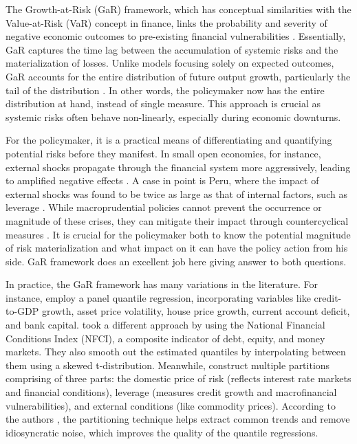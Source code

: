 \documentclass[12pt,a4paper]{article}
\begin{document}
The Growth-at-Risk (GaR) framework, which has conceptual similarities with the Value-at-Risk (VaR) concept in finance, links the probability and severity of negative economic outcomes to pre-existing financial vulnerabilities \citep{imf_gar_2019}. Essentially, GaR captures the time lag between the accumulation of systemic risks and the materialization of losses. Unlike models focusing solely on expected outcomes, GaR accounts for the entire distribution of future output growth, particularly the tail of the distribution \citep{szabo2020}. In other words, the policymaker now has the entire distribution at hand, instead of single measure. This approach is crucial as systemic risks often behave non-linearly, especially during economic downturns.

For the policymaker, it is a practical means of differentiating and quantifying potential risks before they manifest. In small open economies, for instance, external shocks propagate through the financial system more aggressively, leading to amplified negative effects \citep{esrb2021}. A case in point is Peru, where the impact of external shocks was found to be twice as large as that of internal factors, such as leverage \citep{imf_gar_2019}. While macroprudential policies cannot prevent the occurrence or magnitude of these crises, they can mitigate their impact through countercyclical measures \citep{esrb2021}. It is crucial for the policymaker both to know the potential magnitude of risk materialization and what impact on it can have the policy action from his side. GaR framework does an excellent job here giving answer to both questions.

In practice, the GaR framework has many variations in the literature. For instance, \citet{aikman2019} employ a panel quantile regression, incorporating variables like credit-to-GDP growth, asset price volatility, house price growth, current account deficit, and bank capital. \citet{adrian_2019} took a different approach by using the National Financial Conditions Index (NFCI), a composite indicator of debt, equity, and money markets. They also smooth out the estimated quantiles by interpolating between them using a skewed t-distribution. Meanwhile, \citet{imf_gar_2019} construct multiple partitions comprising of three parts: the domestic price of risk (reflects interest rate markets and financial conditions), leverage (measures credit growth and macrofinancial vulnerabilities), and external conditions (like commodity prices). According to the authors \citep{imf_gar_2019}, the partitioning technique helps extract common trends and remove idiosyncratic noise, which improves the quality of the quantile regressions.
\end{document}
